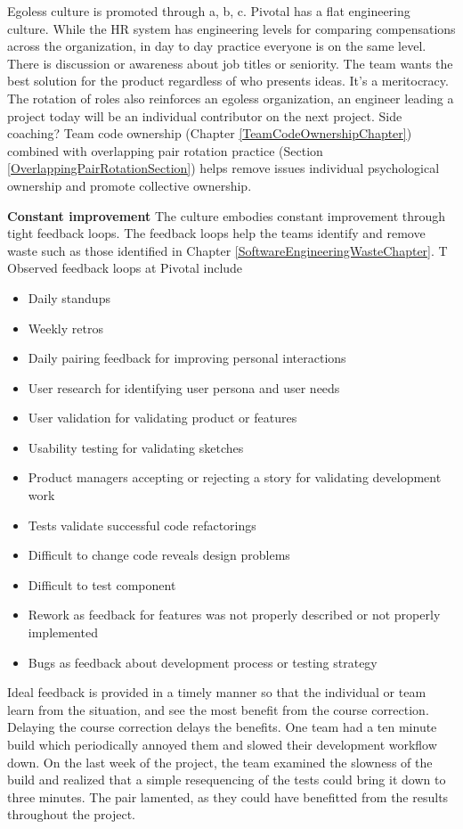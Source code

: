 Egoless culture is promoted through a, b, c. Pivotal has a flat engineering culture. While the HR system has engineering levels for comparing compensations across the organization, in day to day practice everyone is on the same level. There is discussion or awareness about job titles or seniority. The team wants the best solution for the product regardless of who presents ideas. It's a meritocracy. The rotation of roles also reinforces an egoless organization, an engineer leading a project today will be an individual contributor on the next project. Side coaching? Team code ownership (Chapter \ref{TeamCodeOwnershipChapter}) combined with overlapping pair rotation practice (Section \ref{OverlappingPairRotationSection}) helps remove issues individual psychological ownership and promote collective ownership.




\textbf{Constant improvement}
The culture embodies constant improvement through tight feedback loops. The feedback loops help the teams identify and remove waste such as those identified in Chapter \ref{SoftwareEngineeringWasteChapter}. T
Observed feedback loops at Pivotal include
\begin{itemize}
  \item Daily standups
  \item Weekly retros
  \item Daily pairing feedback for improving personal interactions
  \item User research for identifying user persona and user needs
  \item User validation for validating product or features
  \item Usability testing for validating sketches
  \item Product managers accepting or rejecting a story for validating development work
  \item Tests validate successful code refactorings 
  \item Difficult to change code reveals design problems
  \item Difficult to test component
  \item Rework as feedback for features was not properly described or not properly implemented
  \item Bugs as feedback about development process or testing strategy 
\end{itemize}


Ideal feedback is provided in a timely manner so that the individual or team learn from the situation, and see the most benefit from the course correction. Delaying the course correction delays the benefits. One team had a ten minute build which periodically annoyed them and slowed their development workflow down. On the last week of the project, the team examined the slowness of the build and realized that a simple resequencing of the tests could bring it down to three minutes. The pair lamented,  as they could have benefitted from the results throughout the project. 


